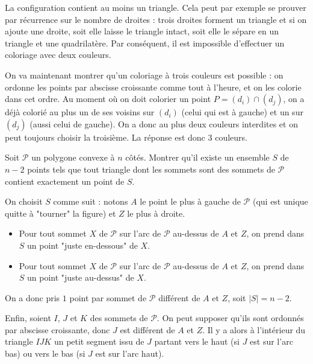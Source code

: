 \begin{sol}
La configuration contient au moins un triangle. Cela peut par exemple se prouver par récurrence sur le nombre de droites  : trois droites forment un triangle et si on ajoute une droite, soit elle laisse le triangle intact, soit elle le sépare en un triangle et une quadrilatère. Par conséquent, il est impossible d'effectuer un coloriage avec deux couleurs.

On va maintenant montrer qu'un coloriage à trois couleurs est possible : on ordonne les points par abscisse croissante comme tout à l'heure, et on les colorie dans cet ordre. Au moment où on doit colorier un point $P=(d_i) \cap (d_j)$, on a déjà colorié au plus un de ses voisins sur $(d_i)$ (celui qui est à gauche) et un sur $(d_j)$ (aussi celui de gauche). On a donc au plus deux couleurs interdites et on peut toujours choisir la troisième. La réponse est donc $3$ couleurs.
\end{sol}

\begin{exo}
Soit $\mathcal{P}$ un polygone convexe à $n$ côtés. Montrer qu'il existe un ensemble $S$ de $n-2$ points tels que tout triangle dont les sommets sont des sommets de $\mathcal{P}$ contient exactement un point de $S$.
\end{exo}

\begin{sol}
On choisit $S$ comme suit : notons $A$ le point le plus à gauche de $\mathcal{P}$ (qui est unique quitte à "tourner" la figure) et $Z$ le plus à droite.
\begin{itemize}
\item
Pour tout sommet $X$ de $\mathcal{P}$ sur l'arc de $\mathcal{P}$ au-dessus de $A$ et $Z$, on prend dans $S$ un point "juste en-dessous" de $X$.
\item
Pour tout sommet $X$ de $\mathcal{P}$ sur l'arc de $\mathcal{P}$ au-dessus de $A$ et $Z$, on prend dans $S$ un point "juste au-dessus" de $X$.
\end{itemize}

On a donc pris $1$ point par sommet de $\mathcal{P}$ différent de $A$ et $Z$, soit $|S|=n-2$.

Enfin, soient $I$, $J$ et $K$ des sommets de $\mathcal{P}$. On peut supposer qu'ils sont ordonnés par abscisse croissante, donc $J$ est différent de $A$ et $Z$. Il y a alors à l'intérieur du triangle $IJK$ un petit segment issu de $J$ partant vers le haut (si $J$ est sur l'arc bas) ou vers le bas (si $J$ est sur l'arc haut).
\end{sol}

